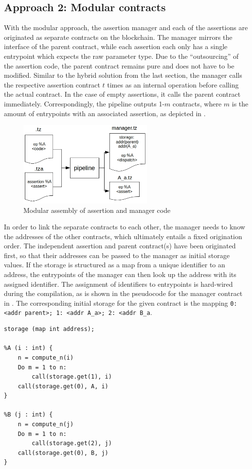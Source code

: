 \subsection{Approach 2: Modular contracts}\label{sec:modular}
With the modular approach, the assertion manager and each of the assertions are originated as separate contracts on the blockchain. The manager mirrors the interface of the parent contract, while each assertion each only has a single entrypoint which expects the raw parameter type. Due to the ``outsourcing'' of the assertion code, the parent contract remains pure and does not have to be modified. Similar to the hybrid solution from the last section, the manager calls the respective assertion contract $t$ times as an internal operation before calling the actual contract. In the case of empty assertions, it calls the parent contract immediately. Correspondingly, the pipeline outputs 1-$m$ contracts, where $m$ is the amount of entrypoints with an associated assertion, as depicted in .
\begin{figure}[h]
\centering
  \includegraphics[width=0.6\textwidth]{figures/5-offline_tezos/pipeline_output_modular.jpg}
	\caption{Modular assembly of assertion and manager code}
	\label{fig:modular_assembly}
\end{figure}

In order to link the separate contracts to each other, the manager needs to know the addresses of the other contracts, which ultimately entails a fixed origination order. The independent assertion and parent contract(s) have been originated first, so that their addresses can be passed to the manager as initial storage values. If the storage is structured as a map from a unique identifier to an address, the entrypoints of the manager can then look up the address with its assigned identifier. The assignment of identifiers to entrypoints is hard-wired during the compilation, as is shown in the pseudocode for the manager contract in . The corresponding initial storage for the given contract is the mapping \texttt{{0: <addr parent>; 1: <addr A\_a>; 2: <addr B\_a}}.
\begin{lstlisting}[label=lst:manager_modular, caption=Implementation of the modular manager in pseudocode]
storage (map int address);

%A (i : int) {
	n = compute_n(i)
	Do m = 1 to n:
		call(storage.get(1), i)
	call(storage.get(0), A, i)
}

%B (j : int) {
	n = compute_n(j)
	Do m = 1 to n:
		call(storage.get(2), j)
	call(storage.get(0), B, j)
}
\end{lstlisting}

